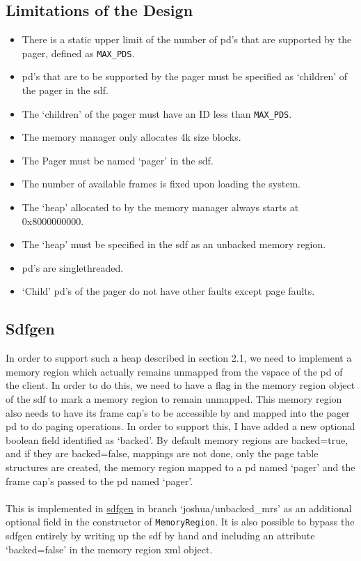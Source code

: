 \documentclass[../thesis.tex]{subfiles}
\begin{document}
\subsection{Limitations of the Design}
\begin{itemize}
    \item There is a static upper limit of the number of \gls{pd}'s that are supported by the pager, defined as \texttt{MAX\_PDS}.
    \item \gls{pd}'s that are to be supported by the pager must be specified as `children' of the pager in the \gls{sdf}.
    \item The `children' of the pager must have an ID less than \texttt{MAX\_PDS}.
    \item The memory manager only allocates 4k size blocks.
    \item The Pager must be named `pager' in the \gls{sdf}.
    \item The number of available frames is fixed upon loading the system.
    \item The `heap' allocated to by the memory manager always starts at 0x8000000000.
    \item The `heap' must be specified in the \gls{sdf} as an unbacked memory region. 
    \item \gls{pd}'s are singlethreaded.
    \item `Child' \gls{pd}'s of the pager do not have other faults except page faults. 
\end{itemize} 
\subsection{Sdfgen}
In order to support such a heap described in section 2.1, we need to implement a memory region which actually remains unmapped from the vspace of the \gls{pd} of the client. In order to do this, we need to have a flag in the memory region object of the \gls{sdf} to mark a memory region to remain unmapped. This memory region also needs to have its frame \gls{cap}'s to be accessible by and mapped into the pager \gls{pd} to do paging operations. In order to support this, I have added a new optional boolean field identified as `backed'. By default memory regions are backed=true, and if they are backed=false, mappings are not done, only the page table structures are created, the memory region mapped to a \gls{pd} named `pager' and the frame \gls{cap}'s passed to the \gls{pd} named `pager'. 
\\\\
This is implemented in \href{https://github.com/au-ts/microkit_sdf_gen}{sdfgen} in branch `joshua/unbacked\_mrs' as an additional optional field in the constructor of \texttt{MemoryRegion}. It is also possible to bypass the sdfgen entirely by writing up the \gls{sdf} by hand and including an attribute `backed=false' in the memory region \gls{xml} object.
\end{document}
